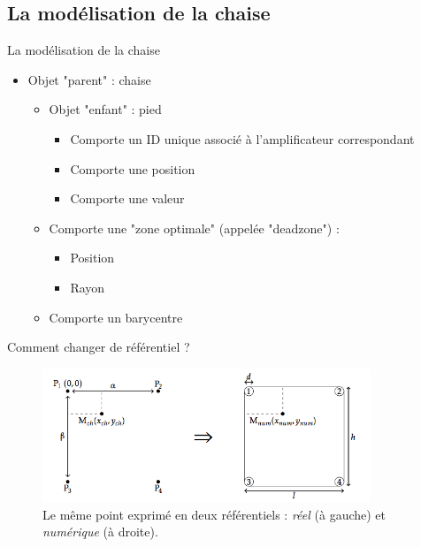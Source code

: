 \documentclass{beamer}
\begin{document}
\subsection{La modélisation de la chaise}
\begin{frame}
\begin{block}{La modélisation de la chaise}
\pause
\begin{itemize}
\item Objet "parent" : chaise
\pause
\begin{itemize}
\item Objet "enfant" : pied
\pause
\begin{itemize}
\item Comporte un ID unique associé à l'amplificateur correspondant
\pause
\item Comporte une position
\pause
\item Comporte une valeur
\end{itemize}
\item Comporte une "zone optimale" (appelée "deadzone") :
\pause
\begin{itemize}
\item Position
\pause
\item Rayon
\pause
\end{itemize}
\item Comporte un barycentre
\end{itemize}
\end{itemize}
\end{block}
\end{frame}

\begin{frame}
\begin{block}{Comment changer de référentiel ?}
\begin{figure}[htbp]
\includegraphics[height=4cm]{images/refs}
\caption{Le même point exprimé en deux référentiels : \textit{réel} (à gauche) et \textit{numérique} (à droite).}
\label{fig:visualisation_referentiels}
\end{figure}
\end{block}
\end{frame}
\end{document}
